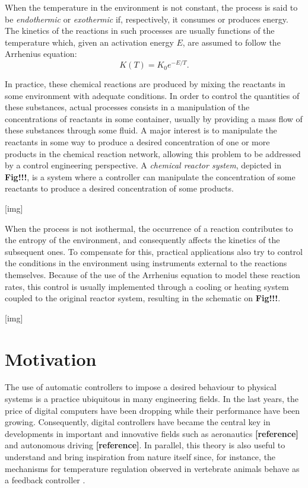 \documentclass[a4paper,11pt]{book}
\numberwithin{figure}{chapter}
\numberwithin{equation}{chapter}
\numberwithin{table}{chapter}
\theoremstyle{definition}
\begin{document}
When the temperature in the environment is not constant, the process is said to be \textit{endothermic} or \textit{exothermic} if, respectively, it consumes or produces energy. The kinetics of the reactions in such processes are usually functions of the temperature which, given an activation energy $E$, are assumed to follow the Arrhenius equation:
\begin{equation} \label{eq:arrhenius1}
    K(T) = K_0 e^{-E / T}
.\end{equation}

In practice, these chemical reactions are produced by mixing the reactants in some environment with adequate conditions. In order to control the quantities of these substances, actual processes consists in a manipulation of the concentrations of reactants in some container, usually by providing a mass flow of these substances through some fluid. A major interest is to manipulate the reactants in some way to produce a desired concentration of one or more products in the chemical reaction network, allowing this problem to be addressed by a control engineering perspective. A \textit{chemical reactor system}, depicted in \textbf{Fig!!!}, is a system where a controller can manipulate the concentration of some reactants to produce a desired concentration of some products.

[img]

When the process is not isothermal, the occurrence of a reaction contributes to the entropy of the environment, and consequently affects the kinetics of the subsequent ones. To compensate for this, practical applications also try to control the conditions in the environment using instruments external to the reactions themselves. Because of the use of the Arrhenius equation to model these reaction rates, this control is usually implemented through a cooling or heating system coupled to the original reactor system, resulting in the schematic on \textbf{Fig!!!}.

[img]

\section{Motivation}

The use of automatic controllers to impose a desired behaviour to physical systems is a practice ubiquitous in many engineering fields. In the last years, the price of digital computers have been dropping while their performance have been growing. Consequently, digital controllers have became the central key in developments in important and innovative fields such as aeronautics \textbf{[reference]} and autonomous driving \textbf{[reference]}. In parallel, this theory is also useful to understand and bring inspiration from nature itself since, for instance, the mechanisms for temperature regulation observed in vertebrate animals behave as a feedback controller \cite{Heller:1978}.
\end{document}
